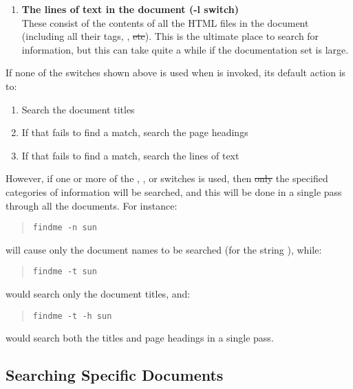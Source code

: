 \begin{enumerate}
\item \label{sect:searchline}{\bf The lines of text in the document (-l switch)}\mbox{}\\
These consist of the contents of all the HTML files in the document
(including all their  tags, ,
\st{etc}). This is the ultimate place to search for information, but
this can take quite a while if the documentation set is large.

\end{enumerate}

If none of the switches shown above is used when  is
invoked, its default action is to:

\begin{enumerate}
\item Search the document titles
\item If that fails to find a match, search the page headings
\item If that fails to find a match, search the lines of text
\end{enumerate}

However, if one or more of the , ,  or 
switches is used, then \st{only} the specified categories of
information will be searched, and this will be done in a single pass
through all the documents. For instance:

\begin{quote}
\begin{verbatim}
findme -n sun
\end{verbatim}
\end{quote}

will cause only the document names to be searched (for the string
), while:

\begin{quote}
\begin{verbatim}
findme -t sun
\end{verbatim}
\end{quote}

would search only the document titles, and:

\begin{quote}
\begin{verbatim}
findme -t -h sun
\end{verbatim}
\end{quote}

would search both the titles and page headings in a single pass.

\subsection{Searching Specific Documents}

